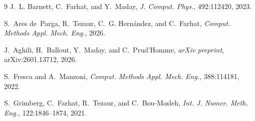 \documentclass[a4paper,11pt]{article}
\begin{document}
\begin{thebibliography}{9}
J.~L. Barnett, C.~Farhat, and Y.~Maday, \emph{J. Comput. Phys.}, 492:112420, 2023.

S.~Ares de~Parga, R.~Tezaur, C.~G. Hern\'{a}ndez, and C.~Farhat, \emph{Comput. Methods Appl. Mech. Eng.}, 2026.

J.~Aghili, H.~Ballout, Y.~Maday, and C.~Prud'Homme, \emph{arXiv preprint}, arXiv:2601.13712, 2026.

S.~Fresca and A.~Manzoni, \emph{Comput. Methods Appl. Mech. Eng.}, 388:114181, 2022.

S.~Grimberg, C.~Farhat, R.~Tezaur, and C.~Bou-Mosleh, \emph{Int. J. Numer. Meth. Eng.}, 122:1846--1874, 2021.
\end{thebibliography}
\end{document}
